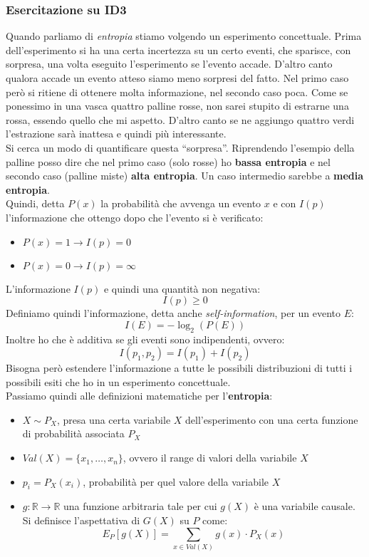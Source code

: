 \subsubsection{Esercitazione su ID3}
Quando parliamo di \textit{entropia} stiamo volgendo un esperimento
concettuale. Prima dell'esperimento si ha una certa incertezza su un certo
eventi, che sparisce, con sorpresa, una volta eseguito l'esperimento se l'evento
accade. D'altro canto qualora accade un evento atteso siamo meno sorpresi del
fatto. Nel primo caso però si ritiene di ottenere molta informazione, nel
secondo caso poca. Come se ponessimo in una vasca quattro palline rosse, non
sarei stupito di estrarne una rossa, essendo quello che mi aspetto. D'altro
canto se ne aggiungo quattro verdi l'estrazione sarà inattesa e quindi più
interessante.\\ 
Si cerca un modo di quantificare questa ``sorpresa''. Riprendendo l'esempio
della palline posso dire che nel primo caso (solo rosse) ho \textbf{bassa
  entropia} e nel secondo caso (palline miste) \textbf{alta entropia}. Un caso
intermedio sarebbe a \textbf{media entropia}.\\
Quindi, detta $P(x)$ la probabilità che avvenga un evento $x$ e con $I(p)$
l'informazione che ottengo dopo che l'evento si è verificato:
\begin{itemize}
  \item $P(x)=1\to I(p)=0$
  \item $P(x)=0\to I(p)=\infty$
\end{itemize}
L'informazione $I(p)$ e quindi una quantità non negativa:
\[I(p)\geq 0\]
Definiamo quindi l'informazione, detta anche \textit{self-information}, per un
evento $E$: 
\[I(E)=-\log_2(P(E))\]
Inoltre ho che è additiva se gli eventi sono indipendenti, ovvero:
\[I(p_1,p_2)=I(p_1)+I(p_2)\]
Bisogna però estendere l'informazione a tutte le possibili distribuzioni di
tutti i possibili esiti che ho in un esperimento concettuale.\\
Passiamo quindi alle definizioni matematiche per l'\textbf{entropia}:
\begin{itemize}
  \item $X\sim P_X$, presa una certa variabile $X$ dell'esperimento con una
  certa funzione di probabilità associata $P_X$
  \item $Val(X)=\{x_1,\ldots,x_n\}$, ovvero il range di valori della variabile
  $X$
  \item $p_i=P_X(x_i)$, probabilità per quel valore della variabile $X$
  \item $g:\mathbb{R}\to\mathbb{R}$ una funzione arbitraria tale per cui $g(X)$
  è una variabile causale. Si definisce l'aspettativa di $G(X)$ su $P$ come:
  \[E_P[g(X)]=\sum_{x\in Val(X)} g(x)\cdot P_X(x)\]
\end{itemize}
